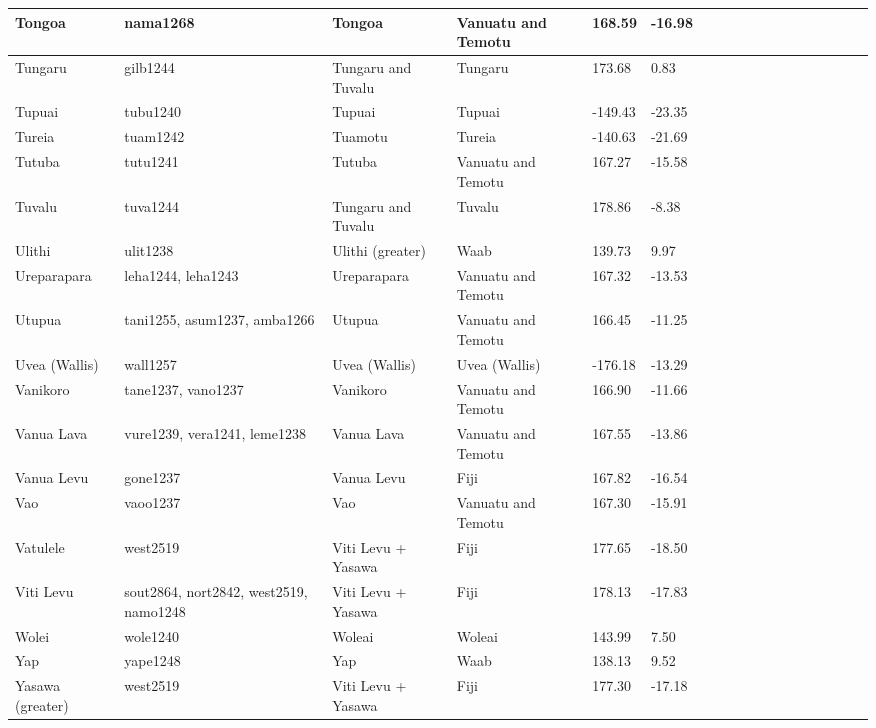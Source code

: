 \documentclass[a4paper,10pt]{article} %
\begin{document}
\begin{landscape}
\begin{longtable}{| p{2.5cm} |  p{7cm} | p{2.5cm}  | p{2.5cm}  | p{2.5cm}  | p{2.5cm}  | p{2.5cm}  | p{2cm}  | p{1cm} | p{1cm}  | p{1cm} | p{1cm}  | p{1.5cm}  | p{1cm} | p{1cm}  | p{1cm}  |p{1cm}  | p{1cm}    |}
 Tongoa & nama1268 & Tongoa & Vanuatu and Temotu & 168.59 & -16.98 \\ \hline
 Tungaru & gilb1244 & Tungaru and Tuvalu & Tungaru & 173.68 & 0.83 \\ \hline
 Tupuai & tubu1240 & Tupuai & Tupuai & -149.43 & -23.35 \\ \hline
 Tureia & tuam1242 & Tuamotu & Tureia & -140.63 & -21.69 \\ \hline
 Tutuba & tutu1241 & Tutuba & Vanuatu and Temotu & 167.27 & -15.58 \\ \hline
 Tuvalu & tuva1244 & Tungaru and Tuvalu & Tuvalu & 178.86 & -8.38 \\ \hline
 Ulithi & ulit1238 & Ulithi (greater) & Waab & 139.73 & 9.97 \\ \hline
 Ureparapara & leha1244, leha1243 & Ureparapara & Vanuatu and Temotu & 167.32 & -13.53 \\ \hline
 Utupua & tani1255, asum1237, amba1266 & Utupua & Vanuatu and Temotu & 166.45 & -11.25 \\ \hline
 Uvea (Wallis) & wall1257 & Uvea (Wallis) & Uvea (Wallis) & -176.18 & -13.29 \\ \hline
 Vanikoro & tane1237, vano1237 & Vanikoro & Vanuatu and Temotu & 166.90 & -11.66 \\ \hline
 Vanua Lava & vure1239, vera1241, leme1238 & Vanua Lava & Vanuatu and Temotu & 167.55 & -13.86 \\ \hline
 Vanua Levu & gone1237 & Vanua Levu & Fiji & 167.82 & -16.54 \\ \hline
 Vao & vaoo1237 & Vao & Vanuatu and Temotu & 167.30 & -15.91 \\ \hline
 Vatulele & west2519 & Viti Levu + Yasawa & Fiji & 177.65 & -18.50 \\ \hline
 Viti Levu & sout2864,  nort2842,  west2519,  namo1248 & Viti Levu + Yasawa & Fiji & 178.13 & -17.83 \\ \hline
 Wolei & wole1240 & Woleai & Woleai & 143.99 & 7.50 \\ \hline
 Yap & yape1248 & Yap & Waab & 138.13 & 9.52 \\ \hline
 Yasawa (greater) & west2519 & Viti Levu + Yasawa & Fiji & 177.30 & -17.18 \\ \hline


 \end{longtable}
\end{landscape}
\newpage
\end{document}
